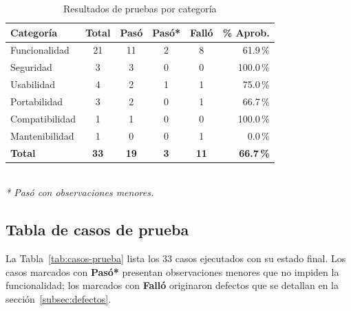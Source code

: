 \begin{table}[H]
  \centering
  \small
  \caption{Resultados de pruebas por categoría}
  \label{tab:resumen-categorias}
  \begin{tabular}{l c c c c r}
    \toprule
    \textbf{Categoría} & \textbf{Total} &
    \textcolor{OliveGreen}{\textbf{Pasó}} &
    \textcolor{BurntOrange}{\textbf{Pasó*}} &
    \textcolor{BrickRed}{\textbf{Falló}} &
    \textbf{\% Aprob.} \\
    \midrule
    Funcionalidad  & 21 & 11 & 2 & 8 & 61.9\,\% \\
    Seguridad      &  3 &  3 & 0 & 0 & 100.0\,\% \\
    Usabilidad     &  4 &  2 & 1 & 1 & 75.0\,\% \\
    Portabilidad   &  3 &  2 & 0 & 1 & 66.7\,\% \\
    Compatibilidad &  1 &  1 & 0 & 0 & 100.0\,\% \\
    Mantenibilidad &  1 &  0 & 0 & 1 &   0.0\,\% \\
    \midrule
    \textbf{Total} & \textbf{33} & \textbf{19} & \textbf{3} & \textbf{11} & \textbf{66.7\,\%} \\
    \bottomrule
  \end{tabular}\\[4pt]
  \footnotesize\textit{* Pasó con observaciones menores.}
\end{table}

\subsection{Tabla de casos de prueba}

La Tabla~\ref{tab:casos-prueba} lista los 33 casos ejecutados con su estado final. Los casos marcados con \textbf{Pasó*} presentan observaciones menores que no impiden la funcionalidad; los marcados con \textbf{Falló} originaron defectos que se detallan en la sección~\ref{subsec:defectos}.

